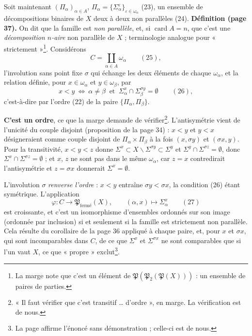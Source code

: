 \documentclass[11pt,a4paper]{article}
\begin{document}

Soit maintenant $(\Pi_\alpha)_{\alpha \in A}$, $\Pi_\alpha =
\{\Sigma_\alpha^{\varepsilon}\}_{\varepsilon \in \omega_\alpha}$ (23), un
ensemble de décompositions binaires de $X$ deux à deux non parallèles (24).
\textbf{Définition (page 37).} On dit que la famille est \emph{non
parallèle}, et, si $\operatorname{card} A = n$, que c'est une
\emph{décomposition $n$-aire} non parallèle de $X$ ;
terminologie analogue pour « strictement »\footnote{La marge note que c'est
un élément de $\mathfrak{P}(\mathfrak{P}_2(\mathfrak{P}(X)))$ : un ensemble
de paires de parties.}. Considérons
\[
C = \coprod_{\alpha \in A} \omega_\alpha \qquad (25),
\]
l'involution sans point fixe $\sigma$ qui échange les deux éléments de chaque
$\omega_\alpha$, et la relation définie, pour $x \in \omega_\alpha$ et $y \in
\omega_\beta$, par
\[
x < y \ \Longleftrightarrow\ \alpha \neq \beta \ \text{ et } \
\Sigma_\alpha^{x} \cap \Sigma_\beta^{\sigma y} = \emptyset \qquad (26),
\]
c'est-à-dire par l'ordre (22) de la paire $\{\Pi_\alpha, \Pi_\beta\}$.

\textbf{C'est un ordre}, ce que la marge demande de vérifier\footnote{« Il
faut vérifier que c'est transitif … d'ordre », en marge. La vérification
est de nous.}. L'antisymétrie vient de l'unicité du couple disjoint
(proposition de la page 34) : $x < y$ et $y < x$ désigneraient comme couple
disjoint de $\Pi_\alpha \times \Pi_\beta$ à la fois $(x, \sigma y)$ et
$(\sigma x, y)$. Pour la transitivité, $x < y < z$ donne $\Sigma^{x} \subset
X \smallsetminus \Sigma^{\sigma y} \subset \Sigma^{y}$ et $\Sigma^{y} \cap
\Sigma^{\sigma z} = \emptyset$, donc $\Sigma^{x} \cap \Sigma^{\sigma z} =
\emptyset$ ; et $x$, $z$ ne sont pas dans le même $\omega_\alpha$, car $z = x$
contredirait l'antisymétrie et $z = \sigma x$ donnerait $\Sigma^{x} =
\emptyset$.

L'involution $\sigma$ \emph{renverse l'ordre} : $x < y$ entraîne $\sigma y <
\sigma x$, la condition (26) étant symétrique. L'application
\[
\varphi \colon C \to \mathfrak{P}_{\text{fermé}}(X), \qquad (\alpha, x)
\mapsto \Sigma_\alpha^{x} \qquad (27)
\]
est croissante, et c'est un isomorphisme d'ensembles ordonnés sur son image
(ordonnée par inclusion) si et seulement si la famille est strictement non
parallèle. Cela résulte du corollaire de la page 36 appliqué à chaque paire,
et, pour $x$ et $\sigma x$, qui sont incomparables dans $C$, de ce que
$\Sigma^{x}$ et $\Sigma^{\sigma x}$ ne sont comparables que si l'un vaut $X$,
ce que « propre » exclut\footnote{La page affirme l'énoncé sans
démonstration ; celle-ci est de nous.}.
\end{document}
